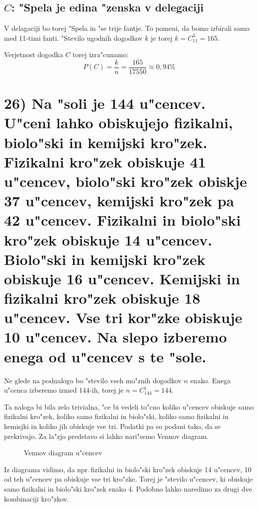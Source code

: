 \documentclass[a4paper, 12pt]{article}
\begin{document}
\subsection*{$C$: "Spela je edina "zenska v delegaciji}
V delagaciji bo torej "Spela in "se trije fantje. To pomeni, da bomo izbirali samo med 11-timi fanti. "Stevilo ugodnih dogodkov $k$ je torej $k = C_{11}^3 = 165$.

Verjetnost dogodka $C$ torej izra"cunamo:
\begin{equation*}
P(C) = \dfrac{k}{n} = \dfrac{165}{17550} \approx 0,94\%
\end{equation*}

\section*{26) Na "soli je 144 u"cencev. U"ceni lahko obiskujejo fizikalni, biolo"ski in kemijski kro"zek. Fizikalni kro"zek obiskuje 41 u"cencev, biolo"ski kro"zek obiskje 37 u"cencev, kemijski kro"zek pa 42 u"cencev. Fizikalni in biolo"ski kro"zek obiskuje 14 u"cencev. Biolo"ski in kemijski kro"zek obiskuje 16 u"cencev. Kemijski in fizikalni kro"zek obiskuje 18 u"cencev. Vse tri kor"zke obiskuje 10 u"cencev. Na slepo izberemo enega od u"cencev s te "sole.}
Ne glede na podnalogo bo "stevilo vseh mo"znih dogodkov $n$ enako. Enega u"cenca izberemo izmed 144-ih, torej je $n = C_{144}^1 = 144$.

Ta naloga bi bila zelo trivialna, "ce bi vedeli to"cno koliko u"cencev obiskuje samo fizikalni kro"zek, koliko samo fizikalni in biolo"ski, koliko samo fizikalni in kemisjki in koliko jih obiskuje vse tri. Podatki pa so podani tako, da se prekrivajo. Za la"zjo predstavo si lahko nari"semo Vennov diagram.
\begin{figure}[!htbp]
	\centering
{}
\caption{Vennov diagram u"cencev}
\end{figure}

Iz diagrama vidimo, da npr.\,fizikalni in biolo"ski kro"zek obiskuje 14 u"cencev, 10 od teh u"cencev pa obiskuje vse tri kro"zke. Torej je "stevilo u"cencev, ki obiskuje samo fizikalni in biolo"ski kro"zek enako 4. Podobno lahko naredimo za drugi dve kombinaciji kro"zkov.
\end{document}
